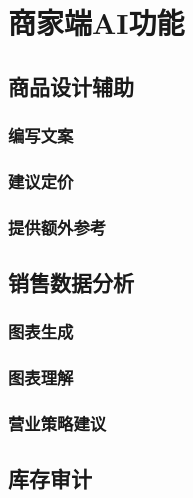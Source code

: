 \newpage
\section{商家端AI功能}
\label{sec:owner_features}

\subsection{商品设计辅助}

\subsubsection{编写文案}

\subsubsection{建议定价}

\subsubsection{提供额外参考}

\subsection{销售数据分析}

\subsubsection{图表生成}

\subsubsection{图表理解}

\subsubsection{营业策略建议}

\subsection{库存审计}